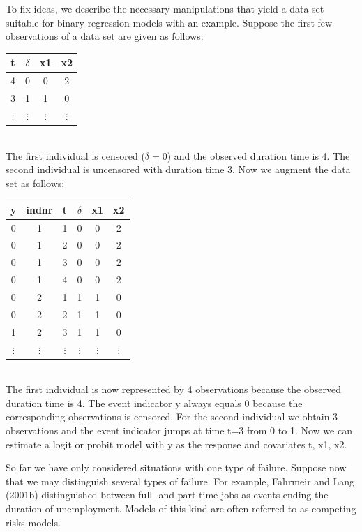\documentclass[11pt,a4paper,twoside]{bayesxarticle}
\begin{document}
To fix ideas, we describe the necessary manipulations that yield a
data set suitable for binary regression models with an example.
Suppose the first few observations of a data set are given as
follows:
\vspace{0.5cm}\\
\begin{tabular}{c|c|c|c}
t & $\delta$ & x1 & x2\\\hline\hline
 4 & 0& 0 &2\\\hline
 3 & 1 &1 &0\\\hline
 $\vdots$ & $\vdots$ & $\vdots$ & $\vdots$\\
\end{tabular}
\vspace{0.5cm}\\
The first individual is censored ($\delta=0$) and the observed
duration time is 4. The second individual is uncensored with
duration time 3. Now we augment the data set as follows:
\vspace{0.5cm}\\
\begin{tabular}{c|c|c|c|c|c}
y & indnr & t &$\delta$ & x1 & x2\\\hline\hline
0 &  1 &   1 & 0  &    0  & 2\\
0 &  1 &   2 & 0  &    0  & 2\\
0 &  1 &   3&  0  &    0 &  2\\
0 &  1  &  4&  0  &    0 &  2\\\hline
0 &  2  &  1 & 1   &   1 &  0\\
0  & 2  &  2 & 1  &    1  & 0\\
1 &  2 &  3 & 1  &  1  & 0\\\hline
 $\vdots$ & $\vdots$ & $\vdots$ & $\vdots$& $\vdots$& $\vdots$\\
\end{tabular}
\vspace{0.5cm}\\
The first individual is now represented by 4 observations because
the observed duration time is 4. The event indicator y always equals
0 because the corresponding observations is censored. For the second
individual we obtain 3 observations and the event indicator jumps at
time t=3 from 0 to 1. Now we can estimate a logit or probit model
with y as the response and covariates t, x1, x2.

So far we have only considered situations with one type of failure.
Suppose now that we may distinguish several types of failure. For
example, Fahrmeir and Lang (2001b) distinguished between full- and
part time jobs as events ending the duration of unemployment. Models
of this kind are often referred to as competing risks models.
\end{document}
